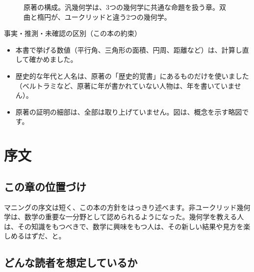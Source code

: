 \documentclass[a4paper,11pt,openany]{ltjsbook}
\begin{document}
\begin{figure}[htbp]
\centering
{}
\caption{原著の構成。汎幾何学は、3つの幾何学に共通な命題を扱う章。双曲と楕円が、ユークリッドと違う2つの幾何学。}
\end{figure}

\begin{notebox}{事実・推測・未確認の区別（この本の約束）}
\begin{itemize}[leftmargin=*]
\item 本書で挙げる数値（平行角、三角形の面積、円周、距離など）は、計算し直して確かめました。
\item 歴史的な年代と人名は、原著の「歴史的覚書」にあるものだけを使いました（ベルトラミなど、原著に年が書かれていない人物は、年を書いていません）。
\item 原著の証明の細部は、全部は取り上げていません。図は、概念を示す略図です。
\end{itemize}
\end{notebox}

\chapter{序文}

\section{この章の位置づけ}

マニングの序文は短く、この本の方針をはっきり述べます。非ユークリッド幾何学は、数学の重要な一分野として認められるようになった。幾何学を教える人は、その知識をもつべきで、数学に興味をもつ人は、その新しい結果や見方を楽しめるはずだ、と。

\section{どんな読者を想定しているか}
\end{document}
